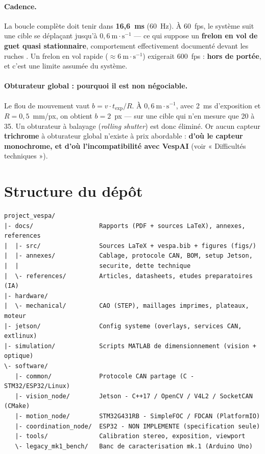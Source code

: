 \documentclass[11pt,a4paper]{article}
\begin{document}
\paragraph{Cadence.} La boucle complète doit tenir dans \textbf{16,6~ms} (60~Hz). À 60~fps,
le système suit une cible se déplaçant jusqu'à $0{,}6~\text{m}\cdot\text{s}^{-1}$ — ce qui
suppose un \textbf{frelon en vol de guet quasi stationnaire}, comportement effectivement
documenté devant les ruches \cite{perrard2009colonie}. Un frelon en vol rapide
($\approx 6~\text{m}\cdot\text{s}^{-1}$) exigerait 600~fps : \textbf{hors de portée}, et
c'est une limite assumée du système.

\paragraph{Obturateur global : pourquoi il est non négociable.} Le flou de mouvement vaut
$b = v \cdot t_{\text{exp}} / R$. À $0{,}6~\text{m}\cdot\text{s}^{-1}$, avec 2~ms
d'exposition et $R = 0{,}5$~mm/px, on obtient $b = 2$~px — sur une cible qui n'en mesure que
20 à 35. Un obturateur à balayage (\emph{rolling shutter}) est donc éliminé. Or aucun
capteur \textbf{trichrome} à obturateur global n'existe à prix abordable : \textbf{d'où le
capteur monochrome, et d'où l'incompatibilité avec VespAI}
(voir « Difficultés techniques »).

\section{Structure du dépôt}

\begin{lstlisting}
project_vespa/
|- docs/                  Rapports (PDF + sources LaTeX), annexes, references
|  |- src/                Sources LaTeX + vespa.bib + figures (figs/)
|  |- annexes/            Cablage, protocole CAN, BOM, setup Jetson,
|  |                      securite, dette technique
|  \- references/         Articles, datasheets, etudes preparatoires (IA)
|- hardware/
|  \- mechanical/         CAO (STEP), maillages imprimes, plateaux, moteur
|- jetson/                Config systeme (overlays, services CAN, extlinux)
|- simulation/            Scripts MATLAB de dimensionnement (vision + optique)
\- software/
   |- common/             Protocole CAN partage (C - STM32/ESP32/Linux)
   |- vision_node/        Jetson - C++17 / OpenCV / V4L2 / SocketCAN (CMake)
   |- motion_node/        STM32G431RB - SimpleFOC / FDCAN (PlatformIO)
   |- coordination_node/  ESP32 - NON IMPLEMENTE (specification seule)
   |- tools/              Calibration stereo, exposition, viewport
   \- legacy_mk1_bench/   Banc de caracterisation mk.1 (Arduino Uno)
\end{lstlisting}
\end{document}
